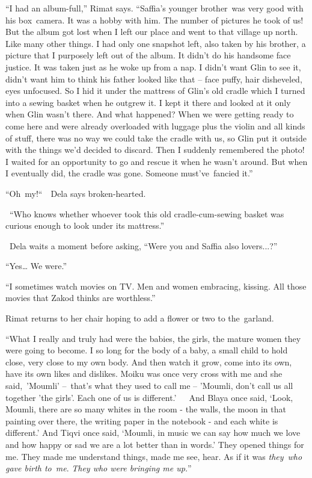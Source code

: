 \documentclass[twoside,11pt]{book}
\begin{document}
``I had an album-full,'' Rimat says. ``Saffia's younger brother~was very good
with his box~camera. It was a hobby with him.  The number of pictures he took of us! But the album got lost when I left
our place and went to that village up north. Like many other things. I had only one snapshot left, also taken by his
brother, a picture that I purposely left out of the album. It didn't do his handsome face justice. It was taken just as
he woke up from a nap. I didn't want Glin to see it, didn't want him to think his father looked like that -- face
puffy, hair disheveled, eyes unfocused. So I hid it under the mattress of Glin's old cradle which I turned into a
sewing basket when he outgrew it. I kept it there and looked at it only when Glin wasn't there. And what happened? When
we were getting ready to come here and were already overloaded with luggage plus the violin and all kinds of stuff,
there was no way we could take the cradle with us, so Glin put it outside with the things we'd decided to discard. Then
I suddenly remembered the photo! I waited for an opportunity to go and rescue it when he wasn't around. But when I
eventually did, the cradle was gone. Someone must've~fancied it.''

``Oh\ my!``\ \ Dela says broken{}-hearted. 

~``Who knows whether whoever took this old cradle-cum-sewing basket was curious enough to look under its
mattress.''

~Dela waits a moment before asking, ``Were you and Saffia also lovers...?''

``Yes{\dots} We were.''

``I sometimes watch movies on TV. Men and women embracing, kissing. All those movies that Zakod thinks are
worthless.''

Rimat returns to her chair hoping to add a flower or two to the\ garland.

``What I really and truly had were the babies, the girls, the mature women they were going to become. I so
long for the body of a baby, a small child to hold close, very close to my own body. And then watch it grow, come into
its own, have its own likes and dislikes. Moiku was once very cross with me and she said,\ {}'Moumli' --\ that's what
they used to call me -- 'Moumli, don't call us all together 'the girls'. Each one of us is different.'\ \ \ And Blaya
once said, `Look, Moumli, there are so many whites in the room - the walls, the moon in that painting over there, the
writing paper in the notebook - and each white is different.' And Tiqvi once said, `Moumli, in music we can say how
much we love and how happy or sad we are a lot better than in words.' They opened things for me. They made me
understand things, made me see, hear. As if it was \textit{they}\ \textit{who gave birth to}\ \textit{me}.\textit{ They
who were bringing me up.}''
\end{document}
